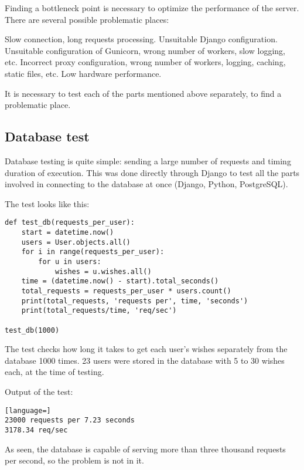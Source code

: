 Finding a bottleneck point is necessary to optimize the performance of the server. There are several possible problematic places:

\begin{itemize}
 Slow connection, long requests processing.
 Unsuitable Django configuration.
 Unsuitable configuration of Gunicorn, wrong number of workers, slow logging, etc.
 Incorrect proxy configuration, wrong number of workers, logging, caching, static files, etc.
 Low hardware performance.
\end{itemize}

It is necessary to test each of the parts mentioned above separately, to find a problematic place.

\subsection{Database test}
Database testing is quite simple: sending a large number of requests and timing duration of execution. This was done directly through Django to test all the parts involved in connecting to the database at once (Django, Python, PostgreSQL).

The test looks like this:

\begin{lstlisting}
def test_db(requests_per_user):
    start = datetime.now()
    users = User.objects.all()
    for i in range(requests_per_user):
        for u in users:
            wishes = u.wishes.all()
    time = (datetime.now() - start).total_seconds()
    total_requests = requests_per_user * users.count()
    print(total_requests, 'requests per', time, 'seconds')
    print(total_requests/time, 'req/sec')

test_db(1000)
\end{lstlisting}

The test checks how long it takes to get each user's wishes separately from the database 1000 times. 23 users were stored in the database with 5 to 30 wishes each, at the time of testing.

Output of the test:

\begin{lstlisting}[language=]
23000 requests per 7.23 seconds
3178.34 req/sec
\end{lstlisting}

As seen, the database is capable of serving more than three thousand requests per second, so the problem is not in it.


